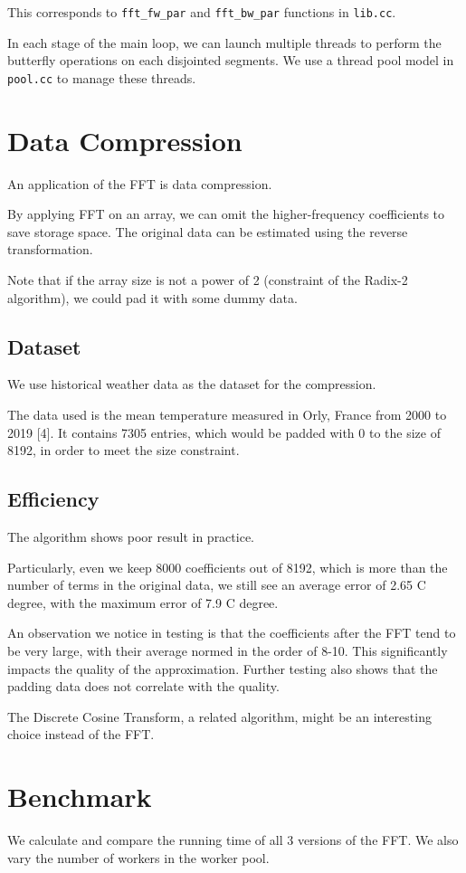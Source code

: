 \documentclass[10pt, letterpaper]{article}
\begin{document}
This corresponds to \texttt{fft\_fw\_par} and \texttt{fft\_bw\_par}
functions in \texttt{lib.cc}.

In each stage of the main loop, we can launch multiple threads to perform
the butterfly operations on each disjointed segments. We use a thread pool
model in \texttt{pool.cc} to manage these threads.


\section{Data Compression}
An application of the FFT is data compression.

By applying FFT on an array, we can omit the higher-frequency coefficients
to save storage space. The original data can be estimated using the reverse
transformation.

Note that if the array size is not a power of 2 (constraint of the Radix-2
algorithm), we could pad it with some dummy data.

\subsection{Dataset}
We use historical weather data as the dataset for the compression.

The data used is the mean temperature measured in Orly, France from
2000 to 2019 [4]. It contains 7305 entries, which would be padded with 0 to
the size of 8192, in order to meet the size constraint.

\subsection{Efficiency}
The algorithm shows poor result in practice.

Particularly, even we keep 8000 coefficients out of 8192, which is more
than the number of terms in the original data, we still see an average
error of 2.65 C degree, with the maximum error of 7.9 C degree.

An observation we notice in testing is that the coefficients after the
FFT tend to be very large, with their average normed in the order of 8-10.
This significantly impacts the quality of the approximation. Further
testing also shows that the padding data does not correlate with the
quality.

The Discrete Cosine Transform, a related algorithm, might be an interesting
choice instead of the FFT.


\section{Benchmark}
We calculate and compare the running time of all 3 versions of the FFT. We
also vary the number of workers in the worker pool.
\end{document}
